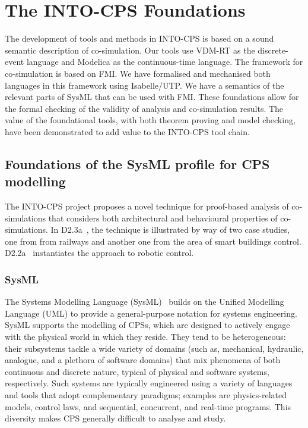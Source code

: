 
\newcommand{\CML}{\textsf{CML}}

\section{The INTO-CPS Foundations}\label{sec:foundations}



The development of tools and methods in INTO-CPS is based on a sound semantic description of co-simulation. Our tools use VDM-RT as the discrete-event language and Modelica as the continuous-time language. The framework for co-simulation is based on FMI. We have formalised and mechanised both languages in this framework using Isabelle/UTP. We have a semantics of the relevant parts of SysML that can be used with FMI. These foundations allow for the formal checking of the validity of analysis and co-simulation results. The value of the foundational tools, with both theorem proving and model checking, have been demonstrated to add value to the INTO-CPS tool chain.

\subsection{Foundations of the SysML profile for CPS modelling}

The INTO-CPS project proposes a novel technique for proof-based analysis of co-simulations that considers both architectural and behavioural properties of co-simulations. In D2.3a~\cite{INTO-CPS-D2.3a-2017}, the technique is illustrated by way of two case studies, one from from railways and another one from the area of smart buildings control. D2.2a~\cite{INTO-CPS-D2.2a-2016} instantiates the approach to robotic control.

\subsubsection{SysML}

The Systems Modelling Language (SysML)~\cite{OMGSysML2012} builds on the Unified Modelling Language (UML) to provide a general-purpose notation for systems engineering. SysML supports the modelling of CPSs, which are designed to actively engage with the physical world in which they reside. They tend to be heterogeneous: their subsystems tackle a wide variety of domains (such as, mechanical, hydraulic, analogue, and a plethora of software domains) that mix phenomena of both continuous and discrete nature, typical of physical and software systems, respectively. Such systems are typically engineered using a variety of languages and tools that adopt complementary paradigms; examples are physics-related models, control laws, and sequential, concurrent, and real-time programs. This diversity makes CPS generally difficult to analyse and study.


